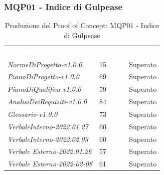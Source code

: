 \subsubsection{MQP01 - Indice di Gulpease}
\begin{table}[H]
        \renewcommand{\arraystretch}{1.5}
        \begin{tabular}{m{}<{\centering}  m{}<{\centering}  m{}<{\centering} }
            \rowcolor{darkblue}
            \textcolor{white}{\textbf{Documento}}& \textcolor{white}{\textbf{Valore}} & \textcolor{white}{\textbf{Esito}}\\ 

            \textit{NormeDiProgetto-v1.0.0} &
            75 &
            Superato \\

            \textit{PianoDiProgetto-v1.0.0} &
            69 &
            Superato \\

            \textit{PianoDiQualifica-v1.0.0} &
            59 &
            Superato \\

            \textit{AnalisiDeiRequisiti-v1.0.0} &
            84 &
            Superato \\
            
            \textit{Glossario-v1.0.0} &
            73 &
            Superato \\

            \textit{VerbaleInterno-2022.01.27} &
            60 &
            Superato \\
            
            \textit{VerbaleInterno-2022.02.03} &
            60 &
            Superato \\

            \textit{Verbale Esterno-2022.01.26} &
            57&
            Superato \\

            \textit{Verbale Esterno-2022-02-08} &
            61&
            Superato \\
    \end{tabular}
    \caption{Produzione del Proof of Concept: MQP01 - Indice di Gulpease}
\end{table}

